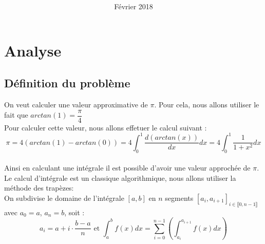 \documentclass{article}
\title{
\LARGE{\textbf{\hmwkClass}}\\
\vspace{0.5in}
\large{\textbf{\hmwkTitle}}
\vspace{3in}
}
\author{\textbf{\hmwkAuthorName}}
\date{Février 2018} %
\begin{document}
\maketitle



\newpage
\tableofcontents
\newpage



\section{Analyse}

\subsection{Définition du problème}

On veut calculer une valeur approximative de $\pi$. Pour cela, nous allons utiliser le fait que $arctan(1) = \dfrac{\pi}{4}$\\

Pour calculer cette valeur, nous allons effetuer le calcul suivant :\\

\[
   \pi = 4(arctan(1) - arctan(0)) = 4\int_0^1 \dfrac{d(arctan(x))}{dx}dx =  4\int_0^1 \dfrac{1}{1 + x^2} dx
\]\\


Ainsi en calculant une intégrale il est possible d'avoir une valeur approchée de $\pi$.
Le calcul d'intégrale est un classique algorithmique, nous allons utiliser la méthode des trapèzes:\\

On subdivise le domaine de l'intégrale $[a,b]$ en $n$ segments $[a_i, a_{i+1}]_{i\in\llbracket0,n-1\rrbracket}$
avec $a_0 = a$, $a_{n} = b$,  soit :\\

\[
a_i = a + i \cdot \dfrac{b-a}{n} \mbox{ et } \int_a^b f(x)dx = \sum_{i=0}^{n-1}\left(\int_{a_i}^{a_{i+1}}f(x)dx\right)
\]\\
\end{document}
